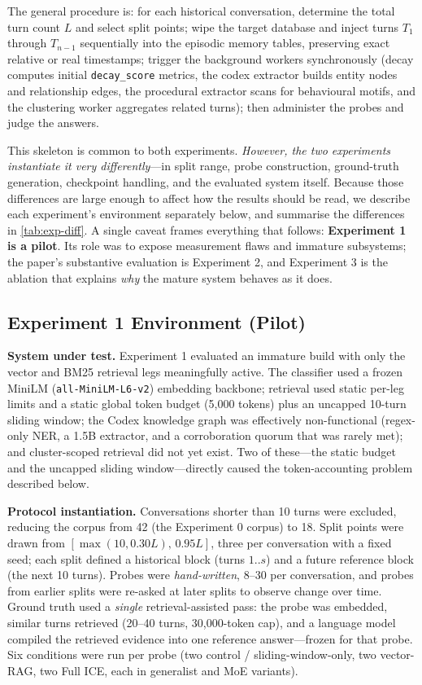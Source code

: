 \documentclass[10pt]{article}
\begin{document}
The general procedure is: for each historical conversation, determine the total turn count $L$ and select split points; wipe the target database and inject turns $T_1$ through $T_{n-1}$ sequentially into the episodic memory tables, preserving exact relative or real timestamps; trigger the background workers synchronously (decay computes initial \texttt{decay\_score} metrics, the codex extractor builds entity nodes and relationship edges, the procedural extractor scans for behavioural motifs, and the clustering worker aggregates related turns); then administer the probes and judge the answers.

This skeleton is common to both experiments. \emph{However, the two experiments instantiate it very differently}---in split range, probe construction, ground-truth generation, checkpoint handling, and the evaluated system itself. Because those differences are large enough to affect how the results should be read, we describe each experiment's environment separately below, and summarise the differences in \cref{tab:exp-diff}. A single caveat frames everything that follows: \textbf{Experiment 1 is a pilot}. Its role was to expose measurement flaws and immature subsystems; the paper's substantive evaluation is Experiment 2, and Experiment 3 is the ablation that explains \emph{why} the mature system behaves as it does.

\subsection{Experiment 1 Environment (Pilot)}
\label{sec:exp1-env}

\textbf{System under test.} Experiment 1 evaluated an immature build with only the vector and BM25 retrieval legs meaningfully active. The classifier used a frozen MiniLM (\texttt{all-MiniLM-L6-v2}) embedding backbone; retrieval used static per-leg limits and a static global token budget (5{,}000 tokens) plus an uncapped 10-turn sliding window; the Codex knowledge graph was effectively non-functional (regex-only NER, a 1.5B extractor, and a corroboration quorum that was rarely met); and cluster-scoped retrieval did not yet exist. Two of these---the static budget and the uncapped sliding window---directly caused the token-accounting problem described below.

\textbf{Protocol instantiation.} Conversations shorter than 10 turns were excluded, reducing the corpus from 42 (the Experiment 0 corpus) to 18. Split points were drawn from $[\max(10,0.30L),\,0.95L]$, three per conversation with a fixed seed; each split defined a historical block (turns $1..s$) and a future reference block (the next 10 turns). Probes were \emph{hand-written}, 8--30 per conversation, and probes from earlier splits were re-asked at later splits to observe change over time. Ground truth used a \emph{single} retrieval-assisted pass: the probe was embedded, similar turns retrieved (20--40 turns, 30{,}000-token cap), and a language model compiled the retrieved evidence into one reference answer---frozen for that probe. Six conditions were run per probe (two control / sliding-window-only, two vector-RAG, two Full ICE, each in generalist and MoE variants).
\end{document}
